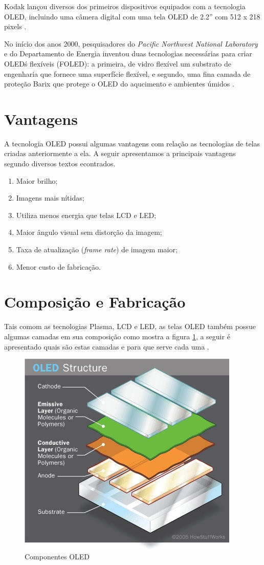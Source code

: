 Kodak lançou diversos dos primeiros dispositivos equipados com a tecnologia OLED, incluindo uma câmera digital com uma tela OLED de 2.2'' com 512 x 218 pixels \cite{WIOLEDT}.

No início dos anos 2000, pesquisadores do \textit{Pacific Northwest National Laboratory} e do Departamento de Energia inventou duas tecnologias necessárias para criar OLED\'s flexíveis (FOLED): a primeira, de vidro flexível um substrato de engenharia que fornece uma superfície flexível, e segundo, uma fina camada de proteção Barix que protege o OLED do aqucimento e ambientes úmidos \cite{WIOLEDT}.


\section{Vantagens}
\label{sec:vantagens}

A tecnologia OLED possui algumas vantagens com relação as tecnologias de telas criadas anteriormente a ela. A seguir apresentamos a principais vantagens segundo diversos textos econtrados.

\begin{enumerate}
	\item Maior brilho;
	\item Imagens mais nítidas;
	\item Utiliza menos energia que telas LCD e LED;
	\item Maior ângulo visual sem distorção da imagem;
	\item Taxa de atualização (\textit{frame rate}) de imagem maior;
	\item Menor custo de fabricação.
\end{enumerate}

\section{Composição e Fabricação}
\label{sec:camadas}

Tais comom as tecnologias Plasma, LCD e LED, as telas OLED também possue algumas camadas em sua composição como mostra a figura \ref{fig:camadas_oled}, a seguir é apresentado quais são estas camadas e para que serve cada uma \cite{HSWOLED}. 

\begin{figure}[!h]
  \centering
  \includegraphics[width=.40\textwidth]{./figuras/camadas_oled} 
  \caption{Componentes OLED}
  \label{fig:camadas_oled} 
\end{figure}


